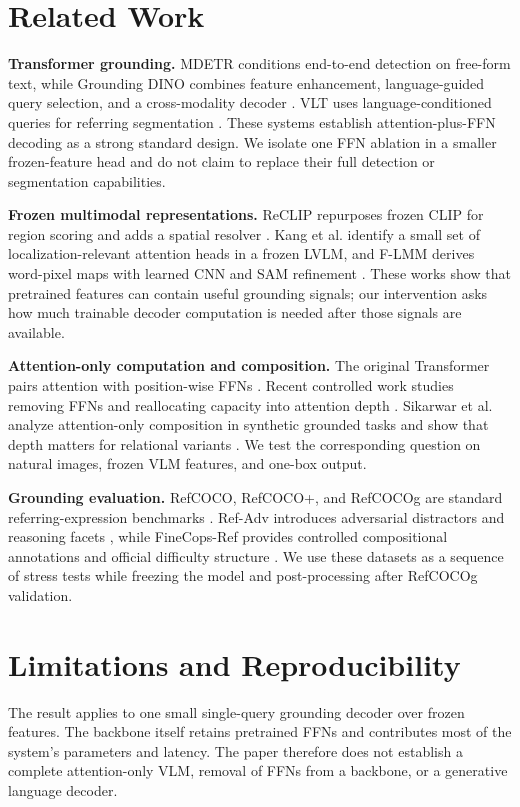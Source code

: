 \documentclass[conference]{IEEEtran}
\begin{document}
\section{Related Work}
\textbf{Transformer grounding.} MDETR conditions end-to-end detection on free-form text, while Grounding DINO combines feature enhancement, language-guided query selection, and a cross-modality decoder \cite{kamath2021mdetr,liu2024groundingdino}. VLT uses language-conditioned queries for referring segmentation \cite{ding2021vlt}. These systems establish attention-plus-FFN decoding as a strong standard design. We isolate one FFN ablation in a smaller frozen-feature head and do not claim to replace their full detection or segmentation capabilities.

\textbf{Frozen multimodal representations.} ReCLIP repurposes frozen CLIP for region scoring and adds a spatial resolver \cite{subramanian2022reclip}. Kang et al. identify a small set of localization-relevant attention heads in a frozen LVLM, and F-LMM derives word-pixel maps with learned CNN and SAM refinement \cite{kang2025heads,wu2025flmm}. These works show that pretrained features can contain useful grounding signals; our intervention asks how much trainable decoder computation is needed after those signals are available.

\textbf{Attention-only computation and composition.} The original Transformer pairs attention with position-wise FFNs \cite{vaswani2017attention}. Recent controlled work studies removing FFNs and reallocating capacity into attention depth \cite{ndubuaku2026attention}. Sikarwar et al. analyze attention-only composition in synthetic grounded tasks and show that depth matters for relational variants \cite{sikarwar2022groundcompose}. We test the corresponding question on natural images, frozen VLM features, and one-box output.

\textbf{Grounding evaluation.} RefCOCO, RefCOCO+, and RefCOCOg are standard referring-expression benchmarks \cite{yu2016context}. Ref-Adv introduces adversarial distractors and reasoning facets \cite{dong2026refadv}, while FineCops-Ref provides controlled compositional annotations and official difficulty structure \cite{liu2024finecops}. We use these datasets as a sequence of stress tests while freezing the model and post-processing after RefCOCOg validation.

\section{Limitations and Reproducibility}
The result applies to one small single-query grounding decoder over frozen features. The backbone itself retains pretrained FFNs and contributes most of the system's parameters and latency. The paper therefore does not establish a complete attention-only VLM, removal of FFNs from a backbone, or a generative language decoder.
\end{document}
